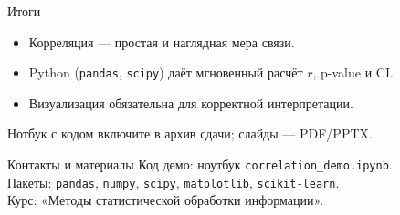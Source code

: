 \documentclass{beamer}
\begin{document}
\begin{frame}{Итоги}
\begin{itemize}
  \item Корреляция — простая и наглядная мера связи.
  \item Python (\texttt{pandas}, \texttt{scipy}) даёт мгновенный расчёт $r$, p-value и CI.
  \item Визуализация обязательна для корректной интерпретации.
\end{itemize}
Нотбук с кодом включите в архив сдачи; слайды — PDF/PPTX.
\end{frame}

\begin{frame}{Контакты и материалы}
Код демо: ноутбук \texttt{correlation\_demo.ipynb}.\\
Пакеты: \texttt{pandas}, \texttt{numpy}, \texttt{scipy}, \texttt{matplotlib}, \texttt{scikit-learn}.\\
Курс: «Методы статистической обработки информации».
\end{frame}
\end{document}

